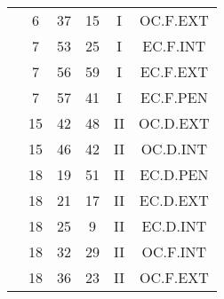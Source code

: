 \documentclass[12pt, a4paper]{article}
\begin{document}
\begin{multicols}{3}
{\begin{tabular}{c c c c c c}
	 	 	 	 & 6 & 37 & 15 & I & OC.F.EXT\\%
	 	 	 	 & 7 & 53 & 25 & I & EC.F.INT\\%
	 	 	 	 & 7 & 56 & 59 & I & EC.F.EXT\\%
	 	 	 	 & 7 & 57 & 41 & I & EC.F.PEN\\%
	 	 	 	 & 15 & 42 & 48 & II & OC.D.EXT\\%
	 	 	 	 & 15 & 46 & 42 & II & OC.D.INT\\%
	 	 	 	 & 18 & 19 & 51 & II & EC.D.PEN\\%
	 	 	 	 & 18 & 21 & 17 & II & EC.D.EXT\\%
	 	 	 	 & 18 & 25 & 9 & II & EC.D.INT\\%
	 	 	 	 & 18 & 32 & 29 & II & OC.F.INT\\%
	 	 	 	 & 18 & 36 & 23 & II & OC.F.EXT\\%
	 	 \end{tabular}
 	}
\end{multicols}
\end{document}
